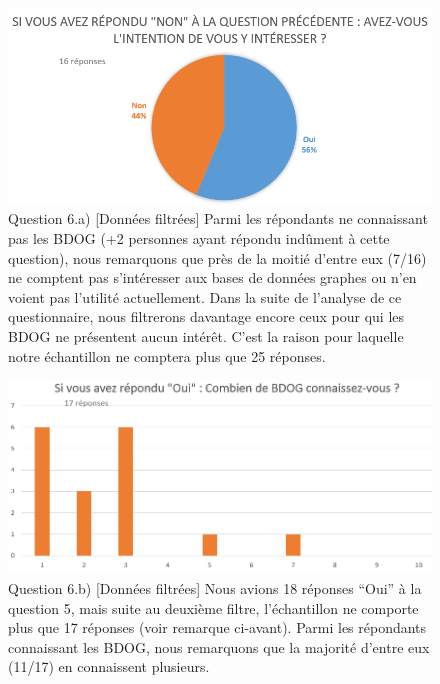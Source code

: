 \documentclass[a4paper,fleqn,12pt,oneside]{report}
\begin{document}
\begin{figure}[!ht]
\centering
\includegraphics[scale=0.8]{figures/QIntFilt.png}
\caption{Question 6.a) [Données filtrées] Parmi les répondants ne connaissant pas les BDOG (+2 personnes ayant  répondu indûment à cette question), nous remarquons que près de la moitié d'entre eux (7/16) ne comptent pas s'intéresser aux bases de données graphes ou n'en voient pas l'utilité actuellement. Dans la suite de l'analyse de ce questionnaire, nous filtrerons davantage encore ceux pour qui les BDOG ne présentent aucun intérêt. C'est la raison pour laquelle notre échantillon ne comptera plus que 25 réponses.}
\label{fig:QIntFilt}
\end{figure}

\newpage
{}

\begin{figure}[!ht]
\centering
\includegraphics[scale=0.8]{figures/QNbFilt.png}
\caption{Question 6.b) [Données filtrées] Nous avions 18 réponses \enquote{Oui} à la question 5, mais suite au deuxième filtre, l'échantillon ne comporte plus que 17 réponses (voir remarque ci-avant). Parmi les répondants connaissant les BDOG, nous remarquons que la majorité d'entre eux (11/17) en connaissent plusieurs.}
\label{fig:QNbFilt}
\end{figure}
\end{document}
